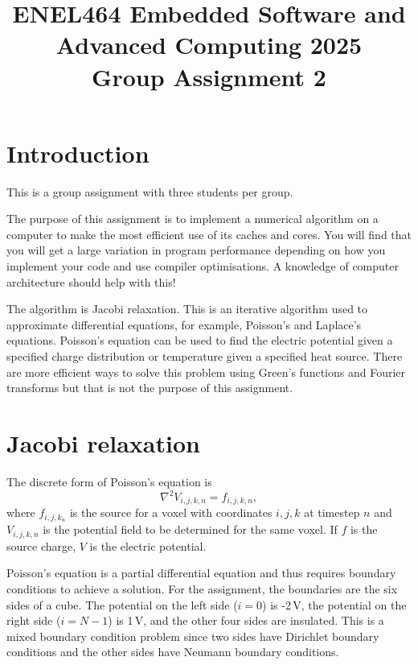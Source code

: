 \documentclass[a4paper,11pt]{article}
\begin{document}
\title{\bf ENEL464 Embedded Software and Advanced Computing 2025 \\ Group Assignment 2}
\author{}
\date{}
\maketitle


\section{Introduction}

This is a group assignment with three students per group.

The purpose of this assignment is to implement a numerical algorithm
on a computer to make the most efficient use of its caches and cores.
You will find that you will get a large variation in program
performance depending on how you implement your code and use compiler
optimisations.  A knowledge of computer architecture should help with
this!

The algorithm is Jacobi relaxation.  This is an iterative algorithm
used to approximate differential equations, for example, Poisson's and
Laplace's equations.  Poisson's equation can be used to find the
electric potential given a specified charge distribution or
temperature given a specified heat source.  There are more efficient
ways to solve this problem using Green's functions and Fourier
transforms but that is not the purpose of this assignment.

\section{Jacobi relaxation}

The discrete form of Poisson's equation is
%
\begin{equation}
  \nabla^2 V_{i,j,k,n} = f_{i,j,k,n},
\end{equation}
%
where $f_{i,j,k_n}$ is the source for a voxel with coordinates $i,j,k$
at timestep $n$ and $V_{i,j,k,n}$ is the potential field to be
determined for the same voxel.  If $f$ is the source charge, $V$ is
the electric potential.

Poisson's equation is a partial differential equation and thus
requires boundary conditions to achieve a solution.  For the
assignment, the boundaries are the six sides of a cube.  The potential
on the left side ($i=0$) is -2\,V, the potential on the right side
($i=N-1$) is 1\,V, and the other four sides are insulated.  This is a
mixed boundary condition problem since two sides have Dirichlet
boundary conditions and the other sides have Neumann boundary
conditions.
\end{document}
